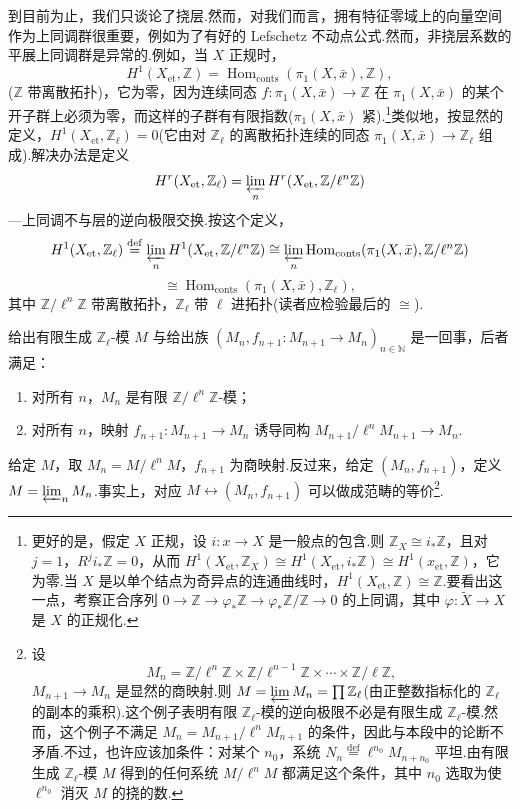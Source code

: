 到目前为止，我们只谈论了挠层.然而，对我们而言，拥有特征零域上的向量空间作为上同调群很重要，例如为了有好的 Lefschetz 不动点公式.然而，非挠层系数的平展上同调群是异常的.例如，当 $X$ 正规时，
\[
H^{1}(X_{\mathrm{et}}, \mathbb{Z}) = \operatorname{Hom}_{\mathrm{conts}}(\pi_1(X, \bar{x}), \mathbb{Z}),
\]
($\mathbb{Z}$ 带离散拓扑)，它为零，因为连续同态 $f \colon \pi_1(X, \bar{x}) \to \mathbb{Z}$ 在 $\pi_1(X, \bar{x})$ 的某个开子群上必须为零，而这样的子群有有限指数($\pi_1(X, \bar{x})$ 紧).\footnote{更好的是，假定 $X$ 正规，设 $i \colon x \to X$ 是一般点的包含.则 $\mathbb{Z}_X \cong i_{*}\mathbb{Z}$，且对 $j = 1$，$R^{j}i_{*}\mathbb{Z} = 0$，从而 $H^{1}(X_{\mathrm{et}}, \mathbb{Z}_X) \cong H^{1}(X_{\mathrm{et}}, i_{*}\mathbb{Z}) \cong H^{1}(x_{\mathrm{et}}, \mathbb{Z})$，它为零.当 $X$ 是以单个结点为奇异点的连通曲线时，$H^{1}(X_{\mathrm{et}}, \mathbb{Z}) \cong \mathbb{Z}$.要看出这一点，考察正合序列 $0 \to \mathbb{Z} \to \varphi_{*}\mathbb{Z} \to \varphi_{*}\mathbb{Z}/\mathbb{Z} \to 0$ 的上同调，其中 $\varphi \colon \widetilde{X} \to X$ 是 $X$ 的正规化.}类似地，按显然的定义，$H^{1}(X_{\mathrm{et}}, \mathbb{Z}_{\ell}) = 0$(它由对 $\mathbb{Z}_{\ell}$ 的离散拓扑连续的同态 $\pi_1(X, \bar{x}) \to \mathbb{Z}_{\ell}$ 组成).解决办法是定义
\[
H^{r}(X_{\mathrm{et}}, \mathbb{Z}_{\ell}) = \varprojlim_{n} H^{r}(X_{\mathrm{et}}, \mathbb{Z}/\ell^{n}\mathbb{Z})
\]
---上同调不与层的逆向极限交换.按这个定义，
\[
H^{1}(X_{\mathrm{et}}, \mathbb{Z}_{\ell}) \overset{\mathrm{def}}{=} \varprojlim_{n} H^{1}(X_{\mathrm{et}}, \mathbb{Z}/\ell^{n}\mathbb{Z}) \cong \varprojlim_{n} \operatorname{Hom}_{\mathrm{conts}}(\pi_1(X, \bar{x}), \mathbb{Z}/\ell^{n}\mathbb{Z})
\]
\[
\cong \operatorname{Hom}_{\mathrm{conts}}(\pi_1(X, \bar{x}), \mathbb{Z}_{\ell}),
\]
其中 $\mathbb{Z}/\ell^{n}\mathbb{Z}$ 带离散拓扑，$\mathbb{Z}_{\ell}$ 带 $\ell$ 进拓扑(读者应检验最后的 $\cong$).

给出有限生成 $\mathbb{Z}_{\ell}$-模 $M$ 与给出族 $(M_n, f_{n+1} \colon M_{n+1} \to M_n)_{n \in \mathbb{N}}$ 是一回事，后者满足：
\begin{enumerate}
  \item 对所有 $n$，$M_n$ 是有限 $\mathbb{Z}/\ell^{n}\mathbb{Z}$-模；
  \item 对所有 $n$，映射 $f_{n+1} \colon M_{n+1} \to M_n$ 诱导同构 $M_{n+1}/\ell^{n}M_{n+1} \to M_n$.
\end{enumerate}
给定 $M$，取 $M_n = M/\ell^{n}M$，$f_{n+1}$ 为商映射.反过来，给定 $(M_n, f_{n+1})$，定义 $M = \varprojlim_{n} M_n$.事实上，对应 $M \leftrightarrow (M_n, f_{n+1})$ 可以做成范畴的等价\footnote{设
\[
M_n = \mathbb{Z}/\ell^{n}\mathbb{Z} \times \mathbb{Z}/\ell^{n-1}\mathbb{Z} \times \cdots \times \mathbb{Z}/\ell\mathbb{Z},
\]
$M_{n+1} \to M_n$ 是显然的商映射.则 $M = \varprojlim M_n = \prod \mathbb{Z}_{\ell}$(由正整数指标化的 $\mathbb{Z}_{\ell}$ 的副本的乘积).这个例子表明有限 $\mathbb{Z}_{\ell}$-模的逆向极限不必是有限生成 $\mathbb{Z}_{\ell}$-模.然而，这个例子不满足 $M_n = M_{n+1}/\ell^{n}M_{n+1}$ 的条件，因此与本段中的论断不矛盾.不过，也许应该加条件：对某个 $n_0$，系统 $N_n \overset{\mathrm{def}}{=} \ell^{n_0}M_{n+n_0}$ 平坦.由有限生成 $\mathbb{Z}_{\ell}$-模 $M$ 得到的任何系统 $M/\ell^{n}M$ 都满足这个条件，其中 $n_0$ 选取为使 $\ell^{n_0}$ 消灭 $M$ 的挠的数.}.

